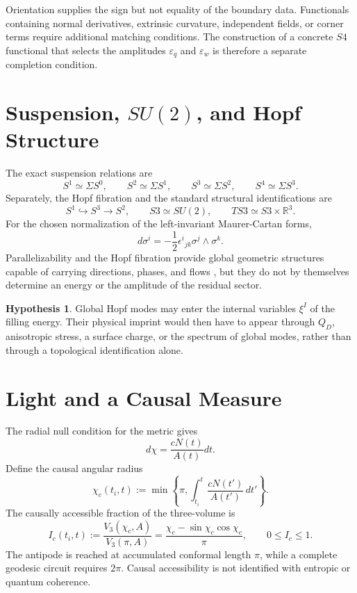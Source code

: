 \documentclass[11pt,a4paper]{article}
\def\Sthree{S3}%
\def\Sfour{S4}%
\def\dd{d}%
\numberwithin{equation}{section}
\theoremstyle{definition}
\newtheorem{hypothesis}[criterion]{Hypothesis}
\theoremstyle{plain}
\theoremstyle{remark}
\newcommand{\Sthree}{S^3}
\newcommand{\Sfour}{S^4}
\newcommand{\QD}{Q_D}
\newcommand{\dd}{\mathrm{d}}
\begin{document}
Orientation supplies the sign but not equality of the boundary data. Functionals containing normal derivatives, extrinsic curvature, independent fields, or corner terms require additional matching conditions. The construction of a concrete \(\Sfour\) functional that selects the amplitudes \(\varepsilon_q\) and \(\varepsilon_w\) is therefore a separate completion condition.


\section{Suspension, \texorpdfstring{$SU(2)$}{SU(2)}, and Hopf Structure}
The exact suspension relations are
\begin{equation}
S^1\simeq\Sigma S^0,
\qquad
S^2\simeq\Sigma S^1,
\qquad
S^3\simeq\Sigma S^2,
\qquad
S^4\simeq\Sigma S^3.
\end{equation}
Separately, the Hopf fibration and the standard structural identifications are
\begin{equation}
S^1\hookrightarrow S^3\to S^2,
\qquad
\Sthree\simeq SU(2),
\qquad
T\Sthree\simeq \Sthree\times\mathbb{R}^3.
\end{equation}
For the chosen normalization of the left-invariant Maurer-Cartan forms,
\begin{equation}
\dd\sigma^i=-\frac{1}{2}\epsilon^i{}_{jk}\sigma^j\wedge\sigma^k.
\end{equation}
Parallelizability and the Hopf fibration provide global geometric structures capable of carrying directions, phases, and flows \cite{Hopf1931}, but they do not by themselves determine an energy or the amplitude of the residual sector.

\begin{hypothesis}
Global Hopf modes may enter the internal variables \(\xi^I\) of the filling energy. Their physical imprint would then have to appear through \(\QD\), anisotropic stress, a surface charge, or the spectrum of global modes, rather than through a topological identification alone.
\end{hypothesis}


\section{Light and a Causal Measure}
The radial null condition for the metric gives
\begin{equation}
\dd\chi=\frac{cN(t)}{A(t)}\dd t.
\end{equation}
Define the causal angular radius
\begin{equation}
\chi_c(t_i,t):=\min\left\{\pi,\int_{t_i}^t\frac{cN(t')}{A(t')}\,\dd t'\right\}.
\end{equation}
The causally accessible fraction of the three-volume is
\begin{equation}
I_c(t_i,t):=\frac{V_3(\chi_c,A)}{V_3(\pi,A)}
=\frac{\chi_c-\sin\chi_c\cos\chi_c}{\pi},
\qquad
0\le I_c\le1.
\end{equation}
The antipode is reached at accumulated conformal length \(\pi\), while a complete geodesic circuit requires \(2\pi\). Causal accessibility is not identified with entropic or quantum coherence.
\end{document}
